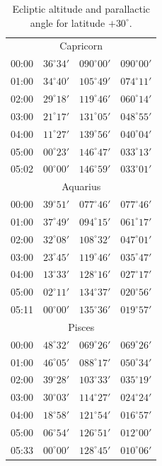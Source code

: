 \begin{table}[!h]
\begin{Parallel}{}{}
{{\begin{tabular}{l|lll}
\multicolumn{4}{c}{Capricorn}\\
00:00 & $36^\circ 34'$ & $090^\circ 00'$ & $090^\circ 00'$\\
01:00 & $34^\circ 40'$ & $105^\circ 49'$ & $074^\circ 11'$\\
02:00 & $29^\circ 18'$ & $119^\circ 46'$ & $060^\circ 14'$\\
03:00 & $21^\circ 17'$ & $131^\circ 05'$ & $048^\circ 55'$\\
04:00 & $11^\circ 27'$ & $139^\circ 56'$ & $040^\circ 04'$\\
05:00 & $00^\circ 23'$ & $146^\circ 47'$ & $033^\circ 13'$\\
05:02 & $00^\circ 00'$ & $146^\circ 59'$ & $033^\circ 01'$\\
\multicolumn{4}{c}{Aquarius}\\
00:00 & $39^\circ 51'$ & $077^\circ 46'$ & $077^\circ 46'$\\
01:00 & $37^\circ 49'$ & $094^\circ 15'$ & $061^\circ 17'$\\
02:00 & $32^\circ 08'$ & $108^\circ 32'$ & $047^\circ 01'$\\
03:00 & $23^\circ 45'$ & $119^\circ 46'$ & $035^\circ 47'$\\
04:00 & $13^\circ 33'$ & $128^\circ 16'$ & $027^\circ 17'$\\
05:00 & $02^\circ 11'$ & $134^\circ 37'$ & $020^\circ 56'$\\
05:11 & $00^\circ 00'$ & $135^\circ 36'$ & $019^\circ 57'$\\
\multicolumn{4}{c}{Pisces}\\
00:00 & $48^\circ 32'$ & $069^\circ 26'$ & $069^\circ 26'$\\
01:00 & $46^\circ 05'$ & $088^\circ 17'$ & $050^\circ 34'$\\
02:00 & $39^\circ 28'$ & $103^\circ 33'$ & $035^\circ 19'$\\
03:00 & $30^\circ 03'$ & $114^\circ 27'$ & $024^\circ 24'$\\
04:00 & $18^\circ 58'$ & $121^\circ 54'$ & $016^\circ 57'$\\
05:00 & $06^\circ 54'$ & $126^\circ 51'$ & $012^\circ 00'$\\
05:33 & $00^\circ 00'$ & $128^\circ 45'$ & $010^\circ 06'$\\
\end{tabular}
}}
\end{Parallel}
\caption{Ecliptic altitude and parallactic angle for latitude $+30^\circ$.}
\end{table}

